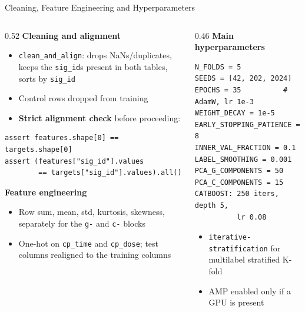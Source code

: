 \documentclass[9pt,aspectratio=169]{beamer}
\begin{document}
\begin{frame}[fragile]{Cleaning, Feature Engineering and Hyperparameters}
  \begin{columns}[T]
    \begin{column}{0.52\textwidth}
      \textbf{Cleaning and alignment}
      \begin{itemize}
        \item \texttt{clean\_and\_align}: drops NaNs/duplicates, keeps the \texttt{sig\_id}s present in both tables, sorts by \texttt{sig\_id}
        \item Control rows dropped from training
        \item \textbf{Strict alignment check} before proceeding:
      \end{itemize}
      \begin{lstlisting}
assert features.shape[0] == targets.shape[0]
assert (features["sig_id"].values
        == targets["sig_id"].values).all()
      \end{lstlisting}
      \vspace{1mm}
      \textbf{Feature engineering}
      \begin{itemize}
        \item Row sum, mean, std, kurtosis, skewness, separately for the \texttt{g-} and \texttt{c-} blocks
        \item One-hot on \texttt{cp\_time} and \texttt{cp\_dose}; test columns realigned to the training columns
      \end{itemize}
    \end{column}
    \begin{column}{0.46\textwidth}
      \textbf{Main hyperparameters}
      \begin{lstlisting}
N_FOLDS = 5
SEEDS = [42, 202, 2024]
EPOCHS = 35          # AdamW, lr 1e-3
WEIGHT_DECAY = 1e-5
EARLY_STOPPING_PATIENCE = 8
INNER_VAL_FRACTION = 0.1
LABEL_SMOOTHING = 0.001
PCA_G_COMPONENTS = 50
PCA_C_COMPONENTS = 15
CATBOOST: 250 iters, depth 5,
          lr 0.08
      \end{lstlisting}
      \begin{itemize}
        \item \texttt{iterative-stratification} for multilabel stratified K-fold
        \item AMP enabled only if a GPU is present
      \end{itemize}
    \end{column}
  \end{columns}
\end{frame}
\end{document}
